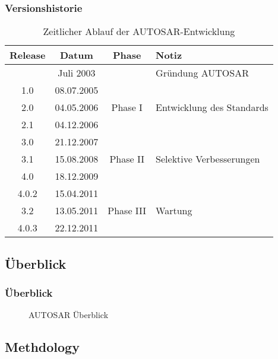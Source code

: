 \documentclass[]{beamer}
\newcommand{\inputImage}[1]{}
\begin{document}
\begin{frame}
\frametitle{Versionshistorie}
    \begin{table}[h]
        \centering
        \begin{tabular}[h]{c c c l}
            \toprule
            Release & Datum & Phase & Notiz\\
            \midrule
                  & Juli 2003  &  & Gründung AUTOSAR\\
            \midrule
            1.0   & 08.07.2005 & \multirow{3}{*}{Phase I} & \\
            2.0	  & 04.05.2006 &  & Entwicklung des Standards\\
            2.1	  & 04.12.2006 &  & \\
            \midrule
            3.0	  & 21.12.2007 & \multirow{3}{*}{Phase II} & \\
            3.1	  & 15.08.2008 &  & Selektive Verbesserungen\\
            4.0	  & 18.12.2009 &  & \\
            \midrule
            4.0.2 & 15.04.2011 & \multirow{3}{*}{Phase III} & \\
            3.2	  & 13.05.2011 &  & Wartung\\
            4.0.3 & 22.12.2011 &  & \\
            \bottomrule
        \end{tabular}
        \caption{Zeitlicher Ablauf der AUTOSAR-Entwicklung}
        \label{tab:timeline}
    \end{table}
\end{frame}

\subsection{Überblick}
\label{sec:überblick}

\begin{frame}[plain]
\frametitle{Überblick}
    \begin{figure}[ht]
        \centering
        \resizebox{0.6\linewidth}{!}{\inputImage{autosar_overview.dia}}
        \caption{AUTOSAR Überblick}
        \label{fig:autosar_overview}
    \end{figure}
\end{frame}

\subsection{Methdology}
\label{sec:methodology}
\end{document}
